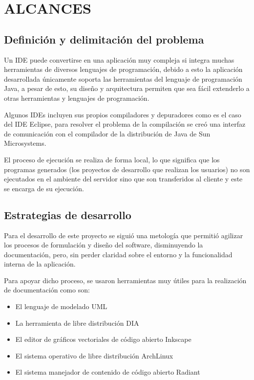 \section{ALCANCES}

\subsection{Definición y delimitación del problema}

Un IDE puede convertirse en una aplicación muy compleja si integra muchas herramientas de diversos lenguajes de programación, debido a esto la aplicación desarrollada únicamente soporta las herramientas del lenguaje de programación Java, a pesar de esto, su diseño y arquitectura permiten que sea fácil extenderlo a otras herramientas y lenguajes de programación.

Algunos IDEs incluyen sus propios compiladores y depuradores como es el caso del IDE Eclipse, para resolver el problema de la compilación se creó una interfaz de comunicación con el compilador de la distribución de Java de Sun Microsystems.

El proceso de ejecución se realiza de forma local, lo que significa que los programas generados (los proyectos de desarrollo que realizan los usuarios) no son ejecutados en el ambiente del servidor sino que son transferidos al cliente y este se encarga de su ejecución.

\subsection{Estrategias de desarrollo}

Para el desarrollo de este proyecto se siguió una metología que permitió agilizar los procesos de formulación y diseño del software, disminuyendo la documentación, pero, sin perder claridad sobre el entorno y la funcionalidad interna de la aplicación.

Para apoyar dicho proceso, se usaron herramientas muy útiles para la realización de documentación como son:

\begin{itemize}
	\item El lenguaje de modelado UML \cite{uml}
	\item La herramienta de libre distribución DIA \cite{dia}
	\item El editor de gráficos vectoriales de código abierto Inkscape \cite{inkscape}
	\item El sistema operativo de libre distribución ArchLinux \cite{archlinux}
	\item El sistema manejador de contenido de código abierto Radiant \cite{radiant}
\end{itemize}

